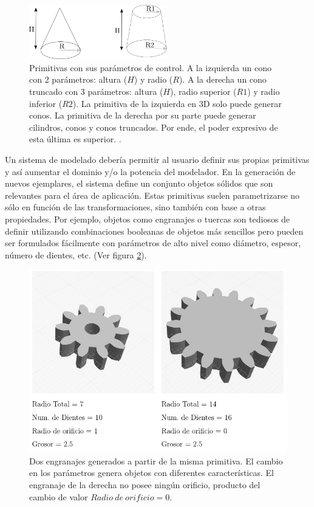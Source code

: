 \begin{figure}[ht]
\includegraphics[width=6cm]{Img/GEO/geo-cono.png}
\centering
\caption{\footnotesize{Primitivas con sus parámetros de control. A la izquierda un cono con 2 parámetros: altura ($H$) y radio ($R$). A la derecha un cono truncado con 3 parámetros: altura ($H$), radio superior ($R1$) y radio inferior ($R2$). La primitiva de la izquierda en 3D solo puede generar conos. La primitiva de la  derecha por su parte puede generar cilindros, conos y conos truncados. Por ende, el poder expresivo de esta última es superior.
\citep{Ramos2011}.}}
\label{fig:csg3}
\end{figure}


Un sistema de modelado debería permitir al usuario definir sus propias primitivas y así aumentar el dominio y/o la potencia del modelador. En la generación de nuevos ejemplares, el sistema define un conjunto objetos sólidos que son relevantes para el área de aplicación. Estas primitivas suelen parametrizarse no sólo en función de las transformaciones, sino también con base a otras propiedades. Por ejemplo, objetos como engranajes o tuercas son tediosos de definir utilizando combinaciones booleanas de objetos más sencillos pero pueden ser formulados fácilmente con parámetros de alto nivel como diámetro, espesor, número de dientes, etc. (Ver figura \ref{fig:csg4}). 


\newline


\begin{figure}[h]
\includegraphics[width=12cm]{Img/Modelos/engranaje.jpg}
\centering
\caption{\footnotesize{Dos engranajes generados a partir de la misma primitiva. El cambio en los parámetros genera objetos con diferentes características. El engranaje de la derecha no posee ningún orificio, producto del cambio de valor $Radio \ de \ orificio = 0$}.}
\label{fig:csg4}
\end{figure}

